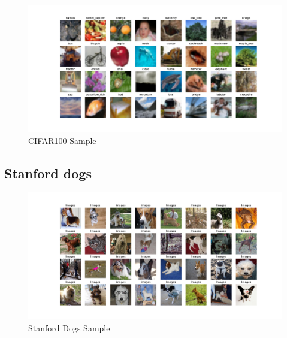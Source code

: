 \begin{figure}[h]
    \centering
    \includegraphics[width=1\textwidth]{images/cifar100.pdf}
	\caption{CIFAR100 Sample}
    \label{fig:cifar100}
\end{figure}

\subsection*{Stanford dogs}
\begin{figure}[h]
    \centering
    \includegraphics[width=1\textwidth]{images/dogs.pdf}
	\caption{Stanford Dogs Sample}
	\label{fig:dogs}
\end{figure}





